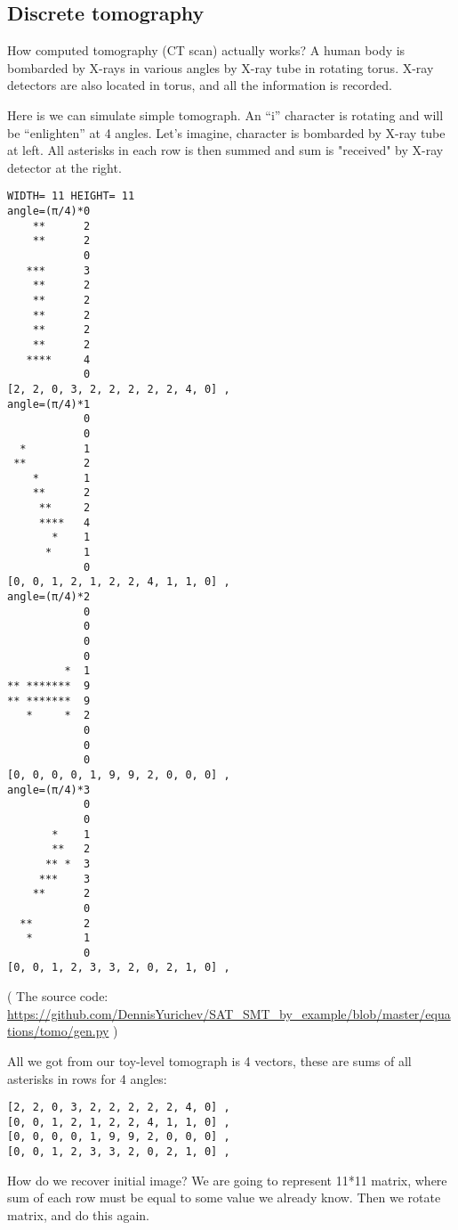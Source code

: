 \subsection{Discrete tomography}

How computed tomography (CT scan) actually works?
A human body is bombarded by X-rays in various angles by X-ray tube in rotating torus.
X-ray detectors are also located in torus, and all the information is recorded.

Here is we can simulate simple tomograph.
An ``i'' character is rotating and will be ``enlighten'' at 4 angles.
Let's imagine, character is bombarded by X-ray tube at left.
All asterisks in each row is then summed and sum is "received" by X-ray detector at the right.

\begin{lstlisting}
WIDTH= 11 HEIGHT= 11
angle=(π/4)*0
    **      2
    **      2
            0
   ***      3
    **      2
    **      2
    **      2
    **      2
    **      2
   ****     4
            0
[2, 2, 0, 3, 2, 2, 2, 2, 2, 4, 0] ,
angle=(π/4)*1
            0
            0
  *         1
 **         2
    *       1
    **      2
     **     2
     ****   4
       *    1
      *     1
            0
[0, 0, 1, 2, 1, 2, 2, 4, 1, 1, 0] ,
angle=(π/4)*2
            0
            0
            0
            0
         *  1
** *******  9
** *******  9
   *     *  2
            0
            0
            0
[0, 0, 0, 0, 1, 9, 9, 2, 0, 0, 0] ,
angle=(π/4)*3
            0
            0
       *    1
       **   2
      ** *  3
     ***    3
    **      2
            0
  **        2
   *        1
            0
[0, 0, 1, 2, 3, 3, 2, 0, 2, 1, 0] ,
\end{lstlisting}

( The source code: \url{https://github.com/DennisYurichev/SAT_SMT_by_example/blob/master/equations/tomo/gen.py} )

All we got from our toy-level tomograph is 4 vectors, these are sums of all asterisks in rows for 4 angles:

\begin{lstlisting}
[2, 2, 0, 3, 2, 2, 2, 2, 2, 4, 0] ,
[0, 0, 1, 2, 1, 2, 2, 4, 1, 1, 0] ,
[0, 0, 0, 0, 1, 9, 9, 2, 0, 0, 0] ,
[0, 0, 1, 2, 3, 3, 2, 0, 2, 1, 0] ,
\end{lstlisting}

How do we recover initial image?
We are going to represent 11*11 matrix, where sum of each row must be equal to some value we already know.
Then we rotate matrix, and do this again.

